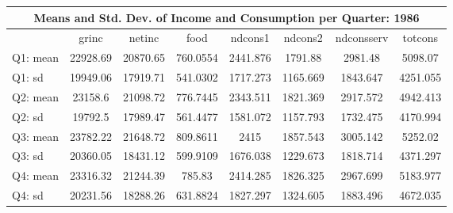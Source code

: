 \begin{tabular}{l*{7}{c}}
\hline\hline
\multicolumn{8}{c}{Means and Std. Dev. of Income and Consumption per Quarter: 1986}  \\
\hline    
            &       grinc&      netinc&        food&     ndcons1&     ndcons2&  ndconsserv&     totcons\\
\hline
Q1: mean          &    22928.69&    20870.65&    760.0554&    2441.876&     1791.88&     2981.48&     5098.07\\
Q1: sd        &    19949.06&    17919.71&    541.0302&    1717.273&    1165.669&    1843.647&    4251.055\\
Q2: mean         &     23158.6&    21098.72&    776.7445&    2343.511&    1821.369&    2917.572&    4942.413\\
Q2: sd         &     19792.5&    17989.47&    561.4477&    1581.072&    1157.793&    1732.475&    4170.994\\
Q3: mean          &    23782.22&    21648.72&    809.8611&        2415&    1857.543&    3005.142&     5252.02\\
Q3: sd          &    20360.05&    18431.12&    599.9109&    1676.038&    1229.673&    1818.714&    4371.297\\
Q4: mean          &    23316.32&    21244.39&      785.83&    2414.285&    1826.325&    2967.699&    5183.977\\
Q4: sd           &    20231.56&    18288.26&    631.8824&    1827.297&    1324.605&    1883.496&    4672.035\\
\hline\hline
\end{tabular}
